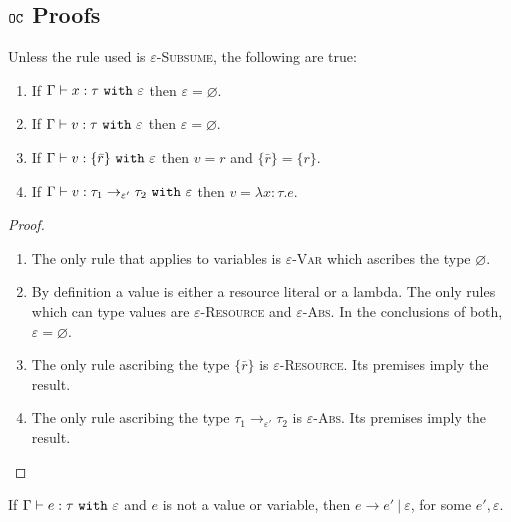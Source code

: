 \begin{appendix}

\chapter{$\mathtt{OC}$ Proofs}

\begin{lemma}
Unless the rule used is \textsc{$\varepsilon$-Subsume}, the following are true:
\begin{enumerate}
	\setlength\itemsep{-0.7em}
	\item If $\Gamma \vdash x: \tau~\mathtt{with}~ \varepsilon$ then $\varepsilon = \varnothing$.
	\item If $ \Gamma \vdash  v:  \tau~\mathtt{with}~ \varepsilon$ then $\varepsilon = \varnothing$.
	\item If $ \Gamma \vdash v: \{ \bar r \}~\mathtt{with}~ \varepsilon$ then $ v = r$ and $\{ \bar r \} = \{ r \}$.
	\item If $\Gamma \vdash v: \tau_1 \rightarrow_{\varepsilon'} \tau_2~\mathtt{with}~ \varepsilon$ then $v = \lambda x:\tau. e$.
\end{enumerate}
\end{lemma}

\begin{proof}
~
\begin{enumerate}
	\setlength\itemsep{-0.7em}
	\item The only rule that applies to variables is \textsc{$\varepsilon$-Var} which ascribes the type $\varnothing$.
	\item By definition a value is either a resource literal or a lambda. The only rules which can type values are \textsc{$\varepsilon$-Resource} and \textsc{$\varepsilon$-Abs}. In the conclusions of both, $\varepsilon = \varnothing$.
	\item The only rule ascribing the type $\{ \bar r \}$ is \textsc{$\varepsilon$-Resource}. Its premises imply the result.
	\item The only rule ascribing the type $\tau_1 \rightarrow_{\varepsilon'} \tau_2$ is \textsc{$\varepsilon$-Abs}. Its premises imply the result.
\end{enumerate}
\end{proof}

\hrulefill


\begin{theorem}
If $ \Gamma \vdash  e:  \tau~\mathtt{with}~ \varepsilon$ and $ e$ is not a value or variable, then $ e \longrightarrow  e'~|~\varepsilon$, for some $e', \varepsilon$.
\end{theorem}


\end{appendix}

